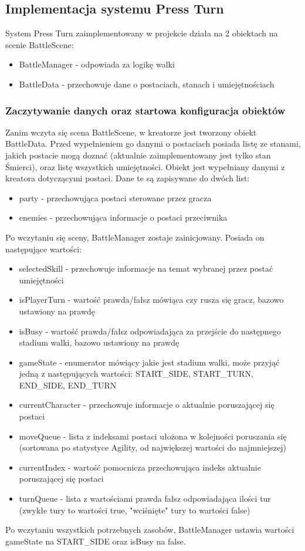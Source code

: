 \documentclass{SGGW-thesis}
\begin{document}
\subsection{Implementacja systemu Press Turn}
System Press Turn zaimplementowany w projekcie działa na 2 obiektach na scenie BattleScene:
\begin{itemize}
  \item{BattleManager - odpowiada za logikę walki}
  \item{BattleData - przechowuje dane o postaciach, stanach i umiejętnościach}
\end{itemize}
\subsubsection{Zaczytywanie danych oraz startowa konfiguracja obiektów}
Zanim wczyta się scena BattleScene, w kreatorze jest tworzony obiekt BattleData. Przed wypełnieniem go danymi o postaciach posiada listę ze stanami, 
jakich postacie mogą doznać (aktualnie zaimplementowany jest tylko stan Śmierci), oraz listę wszystkich umiejętności. Obiekt jest wypełniany danymi z
kreatora dotyczącymi postaci. Dane te są zapisywane do dwóch list:
\begin{itemize}
  \item{party - przechowująca postaci sterowane przez gracza}
  \item{enemies - przechowująca informacje o postaci przeciwnika}
\end{itemize}
Po wczytaniu się sceny, BattleManager zostaje zainicjowany. Posiada on następujące wartości:
\begin{itemize}
  \item{selectedSkill - przechowuje informacje na temat wybranej przez postać umiejętności}
  \item{isPlayerTurn - wartość prawda/fałsz mówiąca czy rusza się gracz, bazowo ustawiony na prawdę}
  \item{isBusy - wartość prawda/fałsz odpowiadająca za przejście do następnego stadium walki, bazowo ustawiony na prawdę}
  \item{gameState - enumerator mówiący jakie jest stadium walki, może przyjąć jedną z następujących wartości: START\_SIDE, START\_TURN, END\_SIDE, END\_TURN}
  \item{currentCharacter - przechowuje informacje o aktualnie poruszającej się postaci}
  \item{moveQueue - lista z indeksami postaci ułożona w kolejności poruszania się (sortowana po statystyce Agility, od największej wartości do najmniejszej)}
  \item{currentIndex - wartość pomocnicza przechowująca indeks aktualnie poruszającej się postaci}
  \item{turnQueue - lista z wartościami prawda fałsz odpowiadająca ilości tur (zwykłe tury to wartości true, "wciśnięte" tury to wartości false)}
\end{itemize}
\pagebreak
Po wczytaniu wszystkich potrzebnych zasobów, BattleManager ustawia wartości gameState na START\_SIDE oraz isBusy na false.
\end{document}

